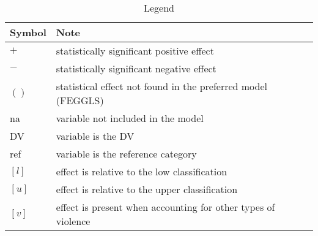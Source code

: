 \begin{table}[!htb]
\centering
\caption{Legend}
\label{table_legend}
\begin{tabular}{ll}
\toprule
Symbol & Note \\
\midrule
$+$    & statistically significant positive effect \\
$-$    & statistically significant negative effect \\
$()$   & statistical effect not found in the preferred model (FEGGLS) \\
na     & variable not included in the model \\
DV     & variable is the DV \\
ref    & variable is the reference category \\
$[l]$  & effect is relative to the low classification \\
$[u]$  & effect is relative to the upper classification \\
$[v]$  & effect is present when accounting for other types of violence\\
\bottomrule
\end{tabular}
\end{table}
